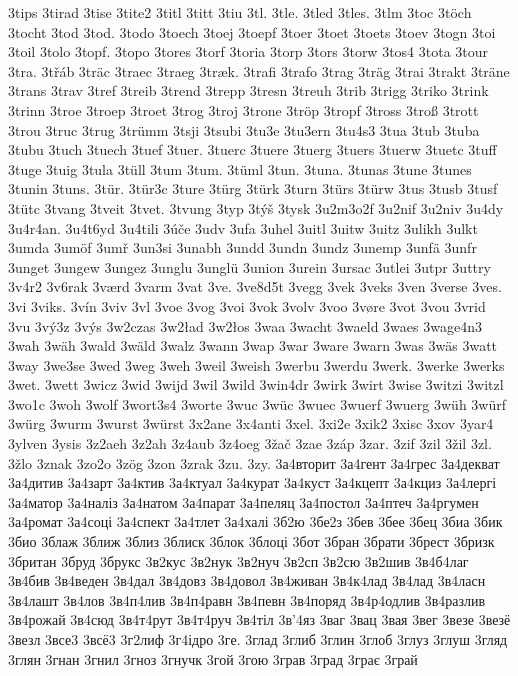 3tips
3tirad
3tise
3tite2
3titl
3titt
3tiu
3tl.
3tle.
3tled
3tles.
3tlm
3toc
3töch
3tocht
3tod
3tod.
3todo
3toech
3toej
3toepf
3toer
3toet
3toets
3toev
3togn
3toi
3toil
3tolo
3topf.
3topo
3tores
3torf
3toria
3torp
3tors
3torw
3tos4
3tota
3tour
3tra.
3třáb
3träc
3traec
3traeg
3træk.
3trafi
3trafo
3trag
3träg
3trai
3trakt
3träne
3trans
3trav
3tref
3treib
3trend
3trepp
3tresn
3treuh
3trib
3trigg
3triko
3trink
3trinn
3troe
3troep
3troet
3trog
3troj
3trone
3tröp
3tropf
3tross
3troß
3trott
3trou
3truc
3trug
3trümm
3tsji
3tsubi
3tu3e
3tu3ern
3tu4s3
3tua
3tub
3tuba
3tubu
3tuch
3tuech
3tuef
3tuer.
3tuerc
3tuere
3tuerg
3tuers
3tuerw
3tuetc
3tuff
3tuge
3tuig
3tula
3tüll
3tum
3tum.
3tüml
3tun.
3tuna.
3tunas
3tune
3tunes
3tunin
3tuns.
3tür.
3tür3c
3ture
3türg
3türk
3turn
3türs
3türw
3tus
3tusb
3tusf
3tütc
3tvang
3tveit
3tvet.
3tvung
3typ
3týš
3tysk
3u2m3o2f
3u2nif
3u2niv
3u4dy
3u4r4an.
3u4t6yd
3u4tili
3úče
3udv
3ufa
3uhel
3uitl
3uitw
3uitz
3ulikh
3ulkt
3umda
3umöf
3umř
3un3si
3unabh
3undd
3undn
3undz
3unemp
3unfä
3unfr
3unget
3ungew
3ungez
3unglu
3unglü
3union
3urein
3ursac
3utlei
3utpr
3uttry
3v4r2
3v6rak
3værd
3varm
3vat
3ve.
3ve8d5t
3vegg
3vek
3veks
3ven
3verse
3ves.
3vi
3viks.
3vín
3viv
3vl
3voe
3vog
3voi
3vok
3volv
3voo
3vøre
3vot
3vou
3vrid
3vu
3vý3z
3výs
3w2czas
3w2ład
3w2łos
3waa
3wacht
3waeld
3waes
3wage4n3
3wah
3wäh
3wald
3wäld
3walz
3wann
3wap
3war
3ware
3warn
3was
3wäs
3watt
3way
3we3se
3wed
3weg
3weh
3weil
3weish
3werbu
3werdu
3werk.
3werke
3werks
3wet.
3wett
3wicz
3wid
3wijd
3wil
3wild
3win4dr
3wirk
3wirt
3wise
3witzi
3witzl
3wo1c
3woh
3wolf
3wort3s4
3worte
3wuc
3wüc
3wuec
3wuerf
3wuerg
3wüh
3würf
3würg
3wurm
3wurst
3würst
3x2ane
3x4anti
3xel.
3xi2e
3xik2
3xisc
3xov
3yar4
3ylven
3ysis
3z2aeh
3z2ah
3z4aub
3z4oeg
3žač
3zae
3záp
3zar.
3zif
3zil
3žil
3zl.
3žlo
3znak
3zo2o
3zög
3zon
3zrak
3zu.
3zy.
3а4вторит
3а4гент
3а4грес
3а4декват
3а4дитив
3а4зарт
3а4ктив
3а4ктуал
3а4курат
3а4куст
3а4кцепт
3а4кциз
3а4лергі
3а4матор
3а4наліз
3а4натом
3а4парат
3а4пеляц
3а4постол
3а4птеч
3а4ргумен
3а4ромат
3а4соці
3а4спект
3а4тлет
3а4халі
3б2ю
3бе2з
3бев
3бее
3бец
3биа
3бик
3био
3блаж
3ближ
3близ
3блиск
3блок
3блоці
3бот
3бран
3брати
3брест
3бризк
3британ
3бруд
3брукс
3в2кус
3в2нук
3в2нуч
3в2сп
3в2сю
3в2шив
3в4б4лаг
3в4бив
3в4веден
3в4дал
3в4довз
3в4довол
3в4живан
3в4к4лад
3в4лад
3в4ласн
3в4лашт
3в4лов
3в4п4лив
3в4п4равн
3в4певн
3в4поряд
3в4р4одлив
3в4разлив
3в4рожай
3в4сюд
3в4т4рут
3в4т4руч
3в4тіл
3в'4яз
3ваг
3вац
3вая
3вег
3везе
3везё
3везл
3все3
3всё3
3г2лиф
3г4ідро
3ге.
3глад
3глиб
3глин
3глоб
3глуз
3глуш
3гляд
3глян
3гнан
3гнил
3гноз
3гнучк
3гой
3гою
3грав
3град
3грає
3грай
